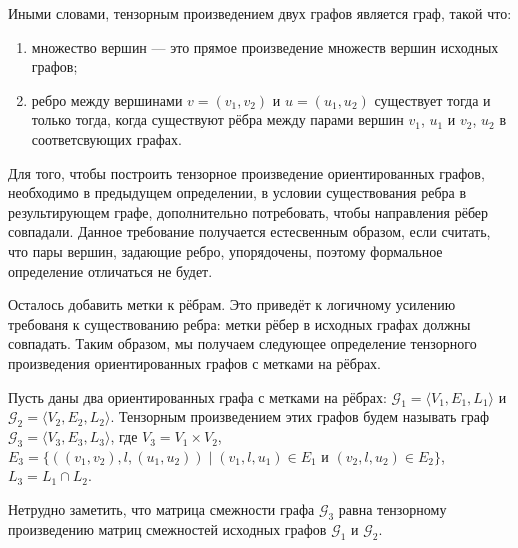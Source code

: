 Иными словами, тензорным произведением двух графов является граф, такой что:
\begin{enumerate}
 \item множество вершин --- это прямое произведение множеств вершин исходных графов;
 \item ребро между вершинами $v=(v_1,v_2)$ и $u=(u_1,u_2)$ существует тогда и только тогда, когда существуют рёбра между парами вершин $v_1$, $u_1$ и $v_2$, $u_2$ в соответсвующих графах.
\end{enumerate}

Для того, чтобы построить тензорное произведение ориентированных графов, необходимо в предыдущем определении, в условии существования ребра в результирующем графе, дополнительно потребовать, чтобы направления рёбер совпадали.
Данное требование получается естесвенным образом, если считать, что пары вершин, задающие ребро, упорядочены, поэтому формальное определение отличаться не будет.

Осталось добавить метки к рёбрам.
Это приведёт к логичному усилению требованя к существованию ребра: метки рёбер в исходных графах должны совпадать.
Таким образом, мы получаем следующее определение тензорного произведения ориентированных графов с метками на рёбрах.

\begin{definition}
Пусть даны два ориентированных графа с метками на рёбрах: $\mathcal{G}_1 = \langle V_1, E_1, L_1 \rangle$ и $\mathcal{G}_2 = \langle V_2, E_2, L_2 \rangle$.
Тензорным произведением этих графов будем называть граф $\mathcal{G}_3 = \langle V_3, E_3, L_3\rangle$, где $V_3 = V_1 \times V_2$, $E_3 = \{ ((v_1,v_2),l,(u_1,u_2)) \mid (v_1,l,u_1) \in E_1 \text{ и } (v_2,l,u_2) \in E_2 \}$, $L_3=L_1 \cap L_2$.
\end{definition}

Нетрудно заметить, что матрица смежности графа $\mathcal{G}_3$ равна тензорному произведению матриц смежностей исходных графов $\mathcal{G}_1$ и $\mathcal{G}_2$.

